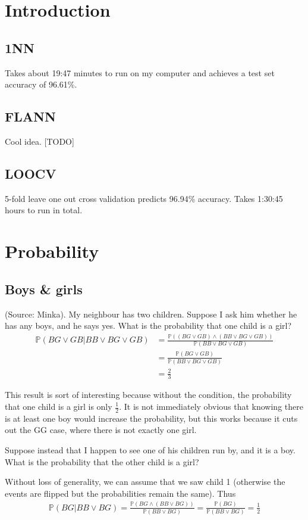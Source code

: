 \documentclass{article}
\begin{document}
\section{Introduction}
\subsection{1NN}
Takes about 19:47 minutes to run on my computer and achieves a test set accuracy of 96.61\%.
\subsection{FLANN}
Cool idea. [TODO]
\subsection{LOOCV}
5-fold leave one out cross validation predicts 96.94\% accuracy. Takes 1:30:45 hours to run in total.
\pagebreak

\section{Probability}
\subsection{Boys \& girls}
(Source: Minka). My neighbour has two children. Suppose I ask him whether he has any boys, and he says yes. What is the probability that one child is a girl?
\begin{align*}
\mathbb{P}(BG \lor GB | BB \lor BG \lor GB) &= \frac{\mathbb{P}((BG \lor GB) \land (BB \lor BG \lor GB))}{\mathbb{P}(BB \lor BG \lor GB)}\\
&= \frac{\mathbb{P}(BG \lor GB)}{\mathbb{P}(BB \lor BG \lor GB)}\\
&= \frac{2}{3}
\end{align*}

This result is sort of interesting because without the condition, the probability that one child is a girl is only $\frac{1}{2}$. It is not immediately obvious that knowing there is at least one boy would increase the probability, but this works because it cuts out the GG case, where there is not exactly one girl.

Suppose instead that I happen to see one of his children run by, and it is a boy. What is the probability that the other child is a girl?

Without loss of generality, we can assume that we saw child 1 (otherwise the events are flipped but the probabilities remain the same). Thus
\begin{gather*}
\mathbb{P}(BG | BB \lor BG) = \frac{\mathbb{P}(BG \land (BB \lor BG))}{\mathbb{P}(BB \lor BG)} = \frac{\mathbb{P}(BG)}{\mathbb{P}(BB \lor BG)} = \frac{1}{2}
\end{gather*}
\end{document}
